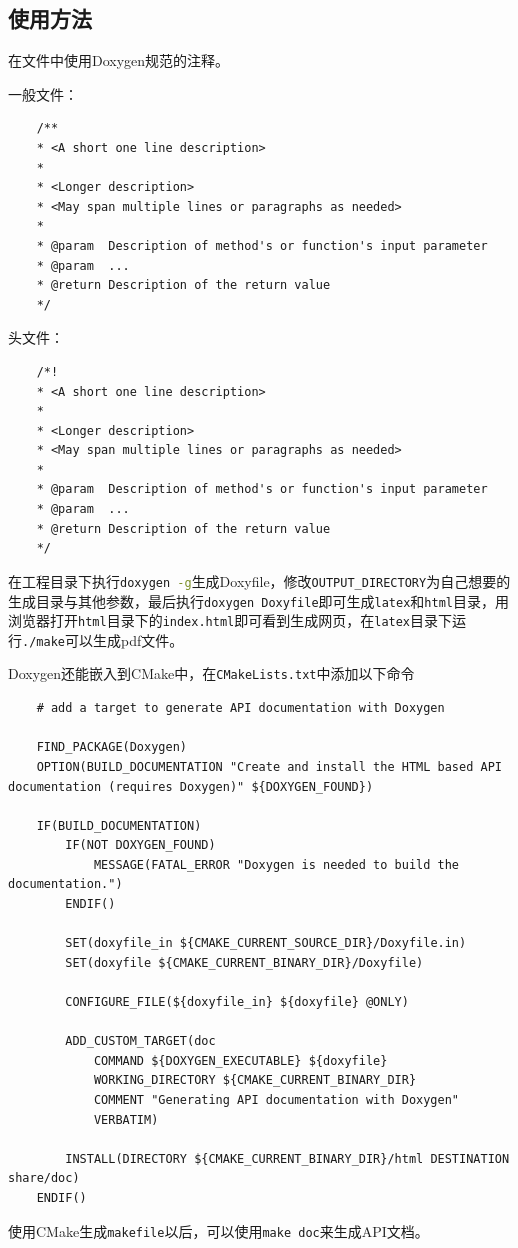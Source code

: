 		\subsection{使用方法}
			\par 在文件中使用Doxygen规范的注释\cite{ wiki:Doxygen}。
			\par\noindent 一般文件：
			\begin{lstlisting}
	/**
	* <A short one line description>
	*
	* <Longer description>
	* <May span multiple lines or paragraphs as needed>
	*
	* @param  Description of method's or function's input parameter
	* @param  ...
	* @return Description of the return value
	*/
			\end{lstlisting}
			\par\noindent 头文件：
			\begin{lstlisting}
	/*!
	* <A short one line description>
	*
	* <Longer description>
	* <May span multiple lines or paragraphs as needed>
	*
	* @param  Description of method's or function's input parameter
	* @param  ...
	* @return Description of the return value
	*/
			\end{lstlisting}
			\par 在工程目录下执行\lstinline[language=sh]{doxygen -g}生成Doxyfile，修改\lstinline{OUTPUT_DIRECTORY}为自己想要的生成目录与其他参数，最后执行\lstinline{doxygen Doxyfile}即可生成\lstinline{latex}和\lstinline{html}目录，用浏览器打开\lstinline{html}目录下的\lstinline{index.html}即可看到生成网页，在\lstinline{latex}目录下运行\lstinline{./make}可以生成pdf文件。
			\par Doxygen还能嵌入到CMake中，在\lstinline{CMakeLists.txt}中添加以下命令
			\begin{lstlisting}
	# add a target to generate API documentation with Doxygen

	FIND_PACKAGE(Doxygen)
	OPTION(BUILD_DOCUMENTATION "Create and install the HTML based API documentation (requires Doxygen)" ${DOXYGEN_FOUND})
	
	IF(BUILD_DOCUMENTATION)
		IF(NOT DOXYGEN_FOUND)
			MESSAGE(FATAL_ERROR "Doxygen is needed to build the documentation.")
		ENDIF()
	
		SET(doxyfile_in ${CMAKE_CURRENT_SOURCE_DIR}/Doxyfile.in)
		SET(doxyfile ${CMAKE_CURRENT_BINARY_DIR}/Doxyfile)
	
		CONFIGURE_FILE(${doxyfile_in} ${doxyfile} @ONLY)
	
		ADD_CUSTOM_TARGET(doc
			COMMAND ${DOXYGEN_EXECUTABLE} ${doxyfile}
			WORKING_DIRECTORY ${CMAKE_CURRENT_BINARY_DIR}
			COMMENT "Generating API documentation with Doxygen"
			VERBATIM)
	
		INSTALL(DIRECTORY ${CMAKE_CURRENT_BINARY_DIR}/html DESTINATION share/doc)
	ENDIF()
			\end{lstlisting}
			\par 使用CMake生成\lstinline{makefile}以后，可以使用\lstinline{make doc}来生成API文档。
